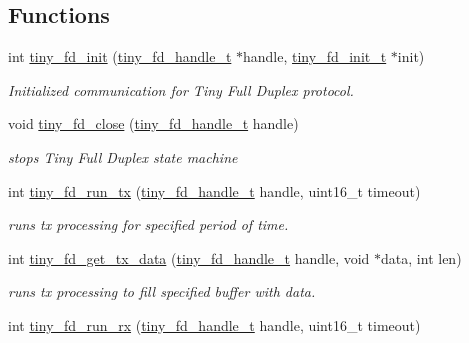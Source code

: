 \subsection*{Functions}
\begin{DoxyCompactItemize}
\item 
int \hyperlink{group__FULL__DUPLEX__API_ga27fa59dffd1575419753beb35282bad5}{tiny\+\_\+fd\+\_\+init} (\hyperlink{group__FULL__DUPLEX__API_ga91e6b79431fe38570fb102701ef0b7e8}{tiny\+\_\+fd\+\_\+handle\+\_\+t} $\ast$handle, \hyperlink{group__FULL__DUPLEX__API_gad19ac27f4ba1d2b807e0a440b0c927d2}{tiny\+\_\+fd\+\_\+init\+\_\+t} $\ast$init)
\begin{DoxyCompactList}\small\item\em Initialized communication for Tiny Full Duplex protocol. \end{DoxyCompactList}\item 
void \hyperlink{group__FULL__DUPLEX__API_ga11e470503e3359bc29a5bcb65a9771d5}{tiny\+\_\+fd\+\_\+close} (\hyperlink{group__FULL__DUPLEX__API_ga91e6b79431fe38570fb102701ef0b7e8}{tiny\+\_\+fd\+\_\+handle\+\_\+t} handle)
\begin{DoxyCompactList}\small\item\em stops Tiny Full Duplex state machine \end{DoxyCompactList}\item 
int \hyperlink{group__FULL__DUPLEX__API_ga601c9874a570331580856c1ea28f7914}{tiny\+\_\+fd\+\_\+run\+\_\+tx} (\hyperlink{group__FULL__DUPLEX__API_ga91e6b79431fe38570fb102701ef0b7e8}{tiny\+\_\+fd\+\_\+handle\+\_\+t} handle, uint16\+\_\+t timeout)
\begin{DoxyCompactList}\small\item\em runs tx processing for specified period of time. \end{DoxyCompactList}\item 
int \hyperlink{group__FULL__DUPLEX__API_ga047059c29688cfcbfd95584e5e435ad2}{tiny\+\_\+fd\+\_\+get\+\_\+tx\+\_\+data} (\hyperlink{group__FULL__DUPLEX__API_ga91e6b79431fe38570fb102701ef0b7e8}{tiny\+\_\+fd\+\_\+handle\+\_\+t} handle, void $\ast$data, int len)
\begin{DoxyCompactList}\small\item\em runs tx processing to fill specified buffer with data. \end{DoxyCompactList}\item 
int \hyperlink{group__FULL__DUPLEX__API_gad31f944514aef01e27bc3ec67fdbe140}{tiny\+\_\+fd\+\_\+run\+\_\+rx} (\hyperlink{group__FULL__DUPLEX__API_ga91e6b79431fe38570fb102701ef0b7e8}{tiny\+\_\+fd\+\_\+handle\+\_\+t} handle, uint16\+\_\+t timeout)

\end{DoxyCompactItemize}
